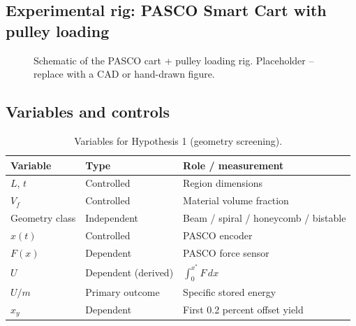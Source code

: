 \documentclass[11pt,a4paper]{article}
\theoremstyle{claim}
\newcommand{\Vf}{V_{\!f}}
\newcommand{\Um}{U/m}
\newcommand{\xy}{x_{\!y}}
\begin{document}
\subsection{Experimental rig: PASCO Smart Cart with pulley loading}

\begin{figure}[H]
  \centering
  \caption{Schematic of the PASCO cart + pulley loading rig.
           Placeholder -- replace with a CAD or hand-drawn figure.}
  \label{fig:rig}
\end{figure}

\subsection{Variables and controls}

\begin{table}[H]
  \centering\small
  \caption{Variables for Hypothesis 1 (geometry screening).}
  \label{tab:h1vars}
  \begin{tabularx}{\linewidth}{@{}l l X@{}}
    \toprule
    Variable & Type & Role / measurement \\
    \midrule
    $L$, $t$ & Controlled & Region dimensions \\
    $\Vf$    & Controlled & Material volume fraction \\
    Geometry class & Independent & Beam / spiral / honeycomb / bistable \\
    $x(t)$   & Controlled & PASCO encoder \\
    $F(x)$   & Dependent  & PASCO force sensor \\
    $U$      & Dependent (derived) & $\int_0^{x^\ast} F\,dx$ \\
    $\Um$    & Primary outcome & Specific stored energy \\
    $\xy$    & Dependent  & First 0.2 percent offset yield \\
    \bottomrule
  \end{tabularx}
\end{table}
\end{document}
